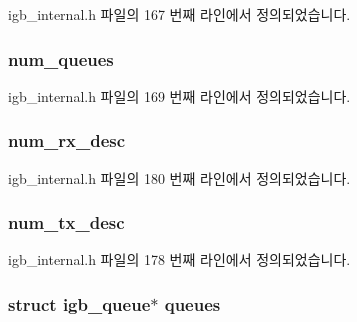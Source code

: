 igb\+\_\+internal.\+h 파일의 167 번째 라인에서 정의되었습니다.

\subsubsection[{\texorpdfstring{num\+\_\+queues}{num_queues}}]{ num\+\_\+queues}\hypertarget{structadapter_a8befb466d4a5a6a432dc1648230e0a65}{}\label{structadapter_a8befb466d4a5a6a432dc1648230e0a65}


igb\+\_\+internal.\+h 파일의 169 번째 라인에서 정의되었습니다.

\subsubsection[{\texorpdfstring{num\+\_\+rx\+\_\+desc}{num_rx_desc}}]{ num\+\_\+rx\+\_\+desc}\hypertarget{structadapter_a7a36fc7297d99f6b73c4b6a194b33efd}{}\label{structadapter_a7a36fc7297d99f6b73c4b6a194b33efd}


igb\+\_\+internal.\+h 파일의 180 번째 라인에서 정의되었습니다.

\subsubsection[{\texorpdfstring{num\+\_\+tx\+\_\+desc}{num_tx_desc}}]{ num\+\_\+tx\+\_\+desc}\hypertarget{structadapter_ab0bd5866ff13aa7c17436220693a3d2d}{}\label{structadapter_ab0bd5866ff13aa7c17436220693a3d2d}


igb\+\_\+internal.\+h 파일의 178 번째 라인에서 정의되었습니다.

\subsubsection[{\texorpdfstring{queues}{queues}}]{\setlength{\rightskip}{0pt plus 5cm}struct igb\+\_\+queue$\ast$ queues}\hypertarget{structadapter_a53f5dff5b81b4cbf3d5b13bf21906cd9}{}\label{structadapter_a53f5dff5b81b4cbf3d5b13bf21906cd9}


